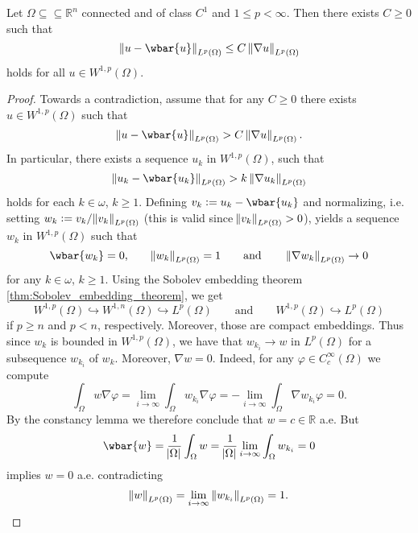 \begin{theorem}
	\label{thm:PW}
	Let $\Omega \subseteq \subseteq \mathbb{R}^n$ connected and of class $C^1$ and $1 \leq p < \infty$. Then there exists $C \geq 0$ such that 
	\begin{equation*}
		\norm[0]{u - \wbar{u}}_{L^p(\Omega)} \leq C \norm[0]{\nabla u}_{L^p(\Omega)}
	\end{equation*}
	\noindent holds for all $u \in W^{1,p}(\Omega)$.
\end{theorem}

\begin{proof}
	Towards a contradiction, assume that for any $C \geq 0$ there exists $u \in W^{1,p}(\Omega)$ such that 
	\begin{equation*}
		\norm[0]{u - \wbar{u}}_{L^p(\Omega)} > C \norm[0]{\nabla u}_{L^p(\Omega)}.
	\end{equation*}
	In particular, there exists a sequence $u_k$ in $W^{1,p}(\Omega)$, such that 
	\begin{equation*}
		\norm[0]{u_k - \wbar{u_k}}_{L^p(\Omega)} > k \norm[0]{\nabla u_k}_{L^p(\Omega)}
	\end{equation*}
	\noindent holds for each $k \in \omega$, $k \geq 1$. Defining $v_k := u_k - \wbar{u_k}$ and normalizing, i.e. setting $w_k := v_k/\norm{v_k}_{L^p(\Omega)}$ (this is valid since $\norm{v_k}_{L^p(\Omega)} > 0$), yields a sequence $w_k$ in $W^{1,p}(\Omega)$ such that 
	\begin{equation*}
		\wbar{w_k} = 0, \qquad \norm{w_k}_{L^p(\Omega)} = 1 \qquad \text{and} \qquad \norm[0]{\nabla w_k}_{L^p(\Omega)} \to 0
	\end{equation*}
	\noindent for any $k \in \omega$, $k \geq 1$. Using the Sobolev embedding theorem \ref{thm:Sobolev_embedding_theorem}, we get
	\begin{equation*}
		W^{1,p}(\Omega) \hookrightarrow W^{1,n}(\Omega) \hookrightarrow L^p(\Omega) \qquad \text{and} \qquad W^{1,p}(\Omega) \hookrightarrow L^p(\Omega)
	\end{equation*}
	\noindent if $p \geq n$ and $p < n$, respectively. Moreover, those are compact embeddings. Thus since $w_k$ is bounded in $W^{1,p}(\Omega)$, we have that $w_{k_i} \to w$ in $L^p(\Omega)$ for a subsequence $w_{k_i}$ of $w_k$. Moreover, $\nabla w = 0$. Indeed, for any $\varphi \in C^\infty_c(\Omega)$ we compute
	\begin{equation*}
		\int_\Omega w\nabla \varphi = \lim_{i \to \infty}\int_\Omega w_{k_i}\nabla\varphi = -\lim_{i \to \infty}\int_\Omega \nabla w_{k_i}\varphi = 0.
	\end{equation*}
	By the constancy lemma we therefore conclude that $w = c \in \mathbb{R}$ a.e. But
	\begin{equation*}
		\wbar{w} = \frac{1}{\abs{\Omega}} \int_\Omega w = \frac{1}{\abs{\Omega}} \lim_{i \to \infty} \int_\Omega w_{k_i} = 0
	\end{equation*}
	\noindent implies $w = 0$ a.e. contradicting
	\begin{equation*}
		\norm{w}_{L^p(\Omega)} = \lim_{i \to \infty} \norm[0]{w_{k_i}}_{L^p(\Omega)} = 1.
	\end{equation*}
\end{proof}





\printbibliography


